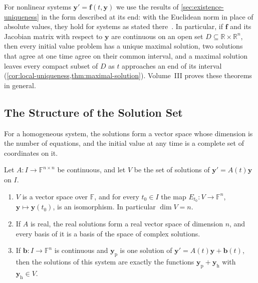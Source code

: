 For nonlinear systems $\mathbf y'=\mathbf f(t,\mathbf y)$ we use the results of \cref{sec:existence-uniqueness} in the form described at its end: with the Euclidean norm in place of absolute values, they hold for systems as stated there~\cite[Chap.~II]{hartman2002}. In particular, if $\mathbf f$ and its Jacobian matrix with respect to $\mathbf y$ are continuous on an open set $D\subseteq\mathbb R\times\mathbb R^n$, then every initial value problem has a unique maximal solution, two solutions that agree at one time agree on their common interval, and a maximal solution leaves every compact subset of $D$ as $t$ approaches an end of its interval (\cref{cor:local-uniqueness,thm:maximal-solution}). Volume~III proves these theorems in general.

\subsection{The Structure of the Solution Set}

For a homogeneous system, the solutions form a vector space whose dimension is the number of equations, and the initial value at any time is a complete set of coordinates on it.

\begin{theorem}
\label{thm:system-solution-space}
Let $A\colon I\to\mathbb F^{n\times n}$ be continuous, and let $V$ be the set of solutions of $\mathbf y'=A(t)\mathbf y$ on $I$.
\begin{enumerate}
\item $V$ is a vector space over $\mathbb F$, and for every $t_0\in I$ the map $E_{t_0}\colon V\to\mathbb F^n$, $\mathbf y\mapsto\mathbf y(t_0)$, is an isomorphism. In particular $\dim V=n$.
\item If $A$ is real, the real solutions form a real vector space of dimension $n$, and every basis of it is a basis of the space of complex solutions.
\item If $\mathbf b\colon I\to\mathbb F^n$ is continuous and $\mathbf y_{\mathrm p}$ is one solution of $\mathbf y'=A(t)\mathbf y+\mathbf b(t)$, then the solutions of this system are exactly the functions $\mathbf y_{\mathrm p}+\mathbf y_{\mathrm h}$ with $\mathbf y_{\mathrm h}\in V$.
\end{enumerate}
\end{theorem}

